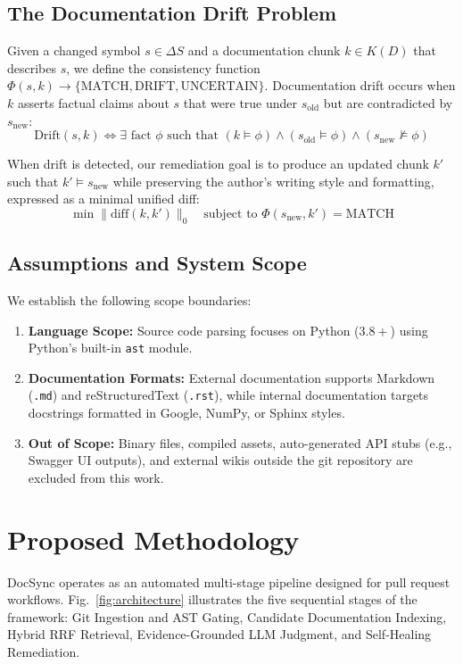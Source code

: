 \documentclass[12pt,onecolumn,draftclsnofoot]{IEEEtran}
\begin{document}
\subsection{The Documentation Drift Problem}
Given a changed symbol $s \in \Delta S$ and a documentation chunk $k \in K(D)$ that describes $s$, we define the consistency function $\Phi(s, k) \to \{ \text{MATCH}, \text{DRIFT}, \text{UNCERTAIN} \}$.
Documentation drift occurs when $k$ asserts factual claims about $s$ that were true under $s_{\text{old}}$ but are contradicted by $s_{\text{new}}$:
\begin{equation}
\text{Drift}(s, k) \iff \exists \text{ fact } \phi \text{ such that } (k \models \phi) \land (s_{\text{old}} \models \phi) \land (s_{\text{new}} \not\models \phi)
\end{equation}

When drift is detected, our remediation goal is to produce an updated chunk $k'$ such that $k' \models s_{\text{new}}$ while preserving the author's writing style and formatting, expressed as a minimal unified diff:
\begin{equation}
\min \|\text{diff}(k, k')\|_0 \quad \text{subject to } \Phi(s_{\text{new}}, k') = \text{MATCH}
\end{equation}

\subsection{Assumptions and System Scope}
We establish the following scope boundaries:
\begin{enumerate}
    \item \textbf{Language Scope:} Source code parsing focuses on Python ($3.8+$) using Python's built-in \texttt{ast} module.
    \item \textbf{Documentation Formats:} External documentation supports Markdown (\texttt{.md}) and reStructuredText (\texttt{.rst}), while internal documentation targets docstrings formatted in Google, NumPy, or Sphinx styles.
    \item \textbf{Out of Scope:} Binary files, compiled assets, auto-generated API stubs (e.g., Swagger UI outputs), and external wikis outside the git repository are excluded from this work.
\end{enumerate}

\section{Proposed Methodology}
DocSync operates as an automated multi-stage pipeline designed for pull request workflows. Fig.~\ref{fig:architecture} illustrates the five sequential stages of the framework: Git Ingestion and AST Gating, Candidate Documentation Indexing, Hybrid RRF Retrieval, Evidence-Grounded LLM Judgment, and Self-Healing Remediation.
\end{document}
